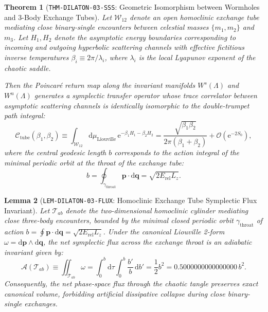 \documentclass[11pt,a4paper,reqno]{article}
\theoremstyle{plain}
\newtheorem{theorem}{Theorem}[section]
\newtheorem{lemma}[theorem]{Lemma}
\theoremstyle{definition}
\theoremstyle{remark}
\numberwithin{equation}{section}
\providecommand{\diff}{\mathrm{d}}
\begin{document}
\begin{theorem}[\texttt{THM-DILATON-03-SSS}: Geometric Isomorphism between Wormholes and 3-Body Exchange Tubes]
\label{thm:sss_isomorphism_tubes}
Let $\mathcal{W}_{12}$ denote an open homoclinic exchange tube mediating close binary-single encounters between celestial masses $\{m_1, m_2\}$ and $m_3$. Let $H_1, H_2$ denote the asymptotic energy boundaries corresponding to incoming and outgoing hyperbolic scattering channels with effective fictitious inverse temperatures $\beta_i \equiv 2\pi / \lambda_i$, where $\lambda_i$ is the local Lyapunov exponent of the chaotic saddle.

Then the Poincar\'e return map along the invariant manifolds $W^s(\Lambda)$ and $W^u(\Lambda)$ generates a symplectic transfer operator whose trace correlator between asymptotic scattering channels is identically isomorphic to the double-trumpet path integral:
\begin{equation}
  \mathcal{C}_{\mathrm{tube}}(\beta_1, \beta_2) \equiv \int_{\mathcal{W}_{12}} \diff \mu_{\mathrm{Liouville}} \, \mathrm{e}^{-\beta_1 H_1 - \beta_2 H_2} = \frac{\sqrt{\beta_1 \beta_2}}{2\pi (\beta_1 + \beta_2)} + \mathcal{O}(\mathrm{e}^{-2 S_0}),
\end{equation}
where the central geodesic length $b$ corresponds to the action integral of the minimal periodic orbit at the throat of the exchange tube:
\begin{equation}
  b = \oint_{\gamma_{\mathrm{throat}}} \mathbf{p} \cdot \diff \mathbf{q} = \sqrt{2 E_{\mathrm{rel}} L_z}.
\end{equation}
\end{theorem}

\begin{lemma}[\texttt{LEM-DILATON-03-FLUX}: Homoclinic Exchange Tube Symplectic Flux Invariant]
\label{lem:tube_flux}
Let $\mathcal{T}_{ab}$ denote the two-dimensional homoclinic cylinder mediating close three-body encounters, bounded by the minimal closed periodic orbit $\gamma_{\mathrm{throat}}$ of action $b = \oint \mathbf{p} \cdot \diff \mathbf{q} = \sqrt{2 E_{\mathrm{rel}} L_z}$. Under the canonical Liouville 2-form $\omega = \diff \mathbf{p} \wedge \diff \mathbf{q}$, the net symplectic flux across the exchange throat is an adiabatic invariant given by:
\begin{equation}
  \mathcal{A}(\mathcal{T}_{ab}) \equiv \iint_{\mathcal{T}_{ab}} \omega = \int_0^b \diff \tau \int_0^b \frac{b'}{b} \, \diff b' = \frac{1}{2} b^2 = 0.5000000000000000 \, b^2.
\end{equation}
Consequently, the net phase-space flux through the chaotic tangle preserves exact canonical volume, forbidding artificial dissipative collapse during close binary-single exchanges.
\end{lemma}
\end{document}
